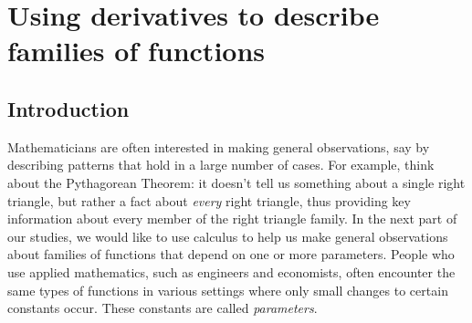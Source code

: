 \section{Using derivatives to describe families of functions} \label{S:3.2.Families}

\vspace*{-14 pt}

\subsection*{Introduction}

Mathematicians are often interested in making general observations, say by describing patterns that hold in a large number of cases.  For example, think about the Pythagorean Theorem: it doesn't tell us something about a single right triangle, but rather a fact about \emph{every} right triangle, thus providing key information about every member of the right triangle family.  In the next part of our studies, we would like to use calculus to help us make general observations about families of functions that depend on one or more parameters.  People who use applied mathematics, such as engineers and economists, often encounter the same types of functions in various settings where only small changes to certain constants occur.  These constants are called \emph{parameters}.  

